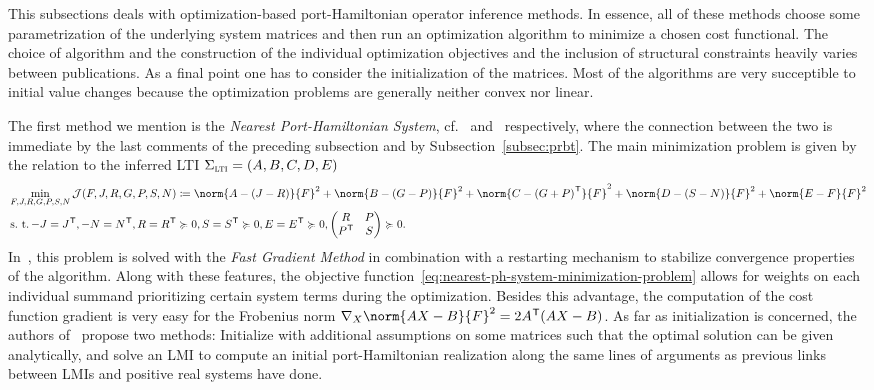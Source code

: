 This subsections deals with optimization-based port-Hamiltonian operator inference methods.
In essence, all of these methods choose some parametrization of the underlying system matrices and then run an optimization algorithm to minimize a chosen cost functional.
The choice of algorithm and the construction of the individual optimization objectives and the inclusion of structural constraints heavily varies between publications.
As a final point one has to consider the initialization of the matrices.
Most of the algorithms are very succeptible to initial value changes because the optimization problems are generally neither convex nor linear.

The first method we mention is the \emph{Nearest Port-Hamiltonian System}, cf.~\cite{Gillis2018} and~\cite{Cherifi2019} respectively, where the connection between the two is immediate by the last comments of the preceding subsection and by Subsection~\ref{subsec:prbt}.
The main minimization problem is given by the relation to the inferred \ac{LTI} $\Sigma_{\textnormal{\scshape lti}} = (A, B, C, D, E)$
\begin{equation}\label{eq:nearest-ph-system-minimization-problem}
    \begin{aligned}
        &\min\limits_{F, J, R, G, P, S, N} \mcl{J}(F, J, R, G, P, S, N) \coloneqq \norm{A - (J - R)}{F}^2 + \norm{B - (G - P)}{F}^2 + \norm{C - {(G + P)}\trans}{F}^2 + \norm{D - (S - N)}{F}^2 + \norm{E - F}{F}^2 \\
        &\suchthat -J = J\trans, -N = N\trans, R = R\trans \succcurlyeq 0, S = S\trans \succcurlyeq 0, E = E\trans \succcurlyeq 0, \begin{pmatrix}
            R & P \\
            P\trans & S
        \end{pmatrix} \succcurlyeq 0.
    \end{aligned}
\end{equation}
In~\cite{Gillis2018}, this problem is solved with the \emph{Fast Gradient Method} in combination with a restarting mechanism to stabilize convergence properties of the algorithm.
Along with these features, the objective function~\eqref{eq:nearest-ph-system-minimization-problem} allows for weights on each individual summand prioritizing certain system terms during the optimization.
Besides this advantage, the computation of the cost function gradient is very easy for the Frobenius norm $\nabla_X \norm{A X - B}{F}^2 = 2 A\trans (A X - B)$.
As far as initialization is concerned, the authors of~\cite{Gillis2018} propose two methods: Initialize with additional assumptions on some matrices such that the optimal solution can be given analytically, and solve an LMI to compute an initial port-Hamiltonian realization along the same lines of arguments as previous links between LMIs and positive real systems have done.

